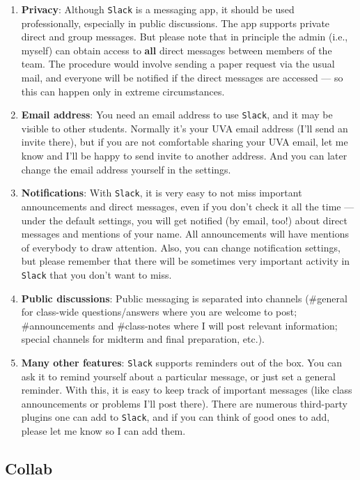 \documentclass[oneside,11pt]{amsart}
\begin{document}
\begin{enumerate}[$\bullet$]
	\item \textbf{Privacy}:
		Although \texttt{Slack} is a messaging app, it should be used
		professionally, especially in public discussions. The app supports private
		direct and group messages. But please note that in principle the admin
		(i.e., myself) can obtain access to \textbf{all} direct messages between
		members of the team. The procedure would involve sending a paper request
		via the usual mail, and everyone will be notified if the direct messages
		are accessed --- so this can happen only in extreme circumstances.
	\item \textbf{Email address}:
		You need an email address to use
		\texttt{Slack}, and it may be visible to other students. 
		Normally it's your UVA email address (I'll send an invite
		there), but if you are not comfortable sharing your UVA email, let me know
		and I'll be happy to send invite to another address.
		And you can later change the email address yourself in the
		settings.
	\item \textbf{Notifications}:
		With \texttt{Slack}, it is very easy to not miss important announcements and direct messages, even if 
		you don't check it all the time --- under the default settings, you will get notified (by email, too!)
		about direct messages and mentions of your name. All announcements will have mentions of everybody
		to draw attention. Also, you can change notification settings, but please remember that
		there will be sometimes very important activity in \texttt{Slack} that you don't want to miss.
	\item \textbf{Public discussions}:
		Public messaging is separated into channels
		(\#general for class-wide questions/answers where you are welcome to post; 
		\#announcements and \#class-notes where I will post relevant information;
		special channels for midterm and final preparation, etc.).  
	\item \textbf{Many other features}: 
		\texttt{Slack} supports reminders out of the box. 
		You can ask it to remind yourself about a particular message, or 
		just set a general reminder. 
		With this, it is 
		easy to keep track of important messages
		(like class announcements or problems I'll post there).
		There are numerous third-party plugins one can add to \texttt{Slack}, and if you can 
		think of good ones to add, please let me know so I can add them.

\end{enumerate}

\subsection{Collab}
\end{document}
